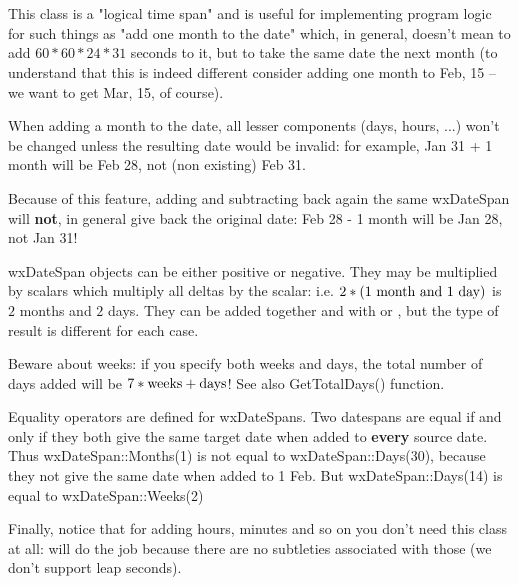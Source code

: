 
\section{}\label{wxdatespan}

This class is a "logical time span" and is useful for implementing program
logic for such things as "add one month to the date" which, in general,
doesn't mean to add $60*60*24*31$ seconds to it, but to take the same date
the next month (to understand that this is indeed different consider adding
one month to Feb, 15 -- we want to get Mar, 15, of course).

When adding a month to the date, all lesser components (days, hours, ...)
won't be changed unless the resulting date would be invalid: for example,
Jan 31 + 1 month will be Feb 28, not (non existing) Feb 31.

Because of this feature, adding and subtracting back again the same
wxDateSpan will {\bf not}, in general give back the original date: Feb 28 - 1
month will be Jan 28, not Jan 31!

wxDateSpan objects can be either positive or negative. They may be
multiplied by scalars which multiply all deltas by the scalar: i.e.
$2*(1 \hbox{ month and } 1 \hbox{ day})$ is $2$ months and $2$ days. They can
be added together and with  or 
, but the type of result is different for each
case.

Beware about weeks: if you specify both weeks and days, the total number of
days added will be $7*\hbox{weeks} + \hbox{days}$! See also GetTotalDays()
function.

Equality operators are defined for wxDateSpans. Two datespans are equal if
and only if they both give the same target date when added to {\bf every}
source date. Thus wxDateSpan::Months(1) is not equal to wxDateSpan::Days(30),
because they not give the same date when added to 1 Feb. But
wxDateSpan::Days(14) is equal to wxDateSpan::Weeks(2)

Finally, notice that for adding hours, minutes and so on you don't need this
class at all:  will do the job because there
are no subtleties associated with those (we don't support leap seconds).

